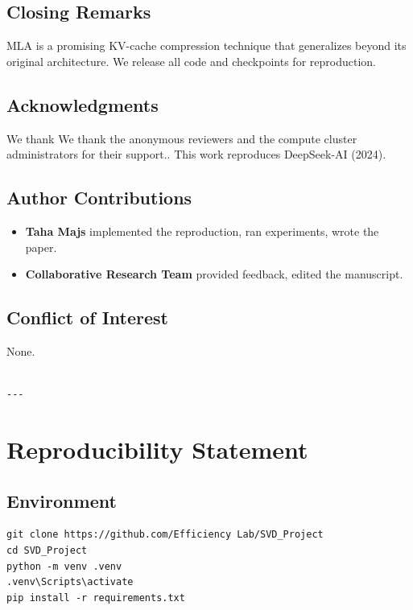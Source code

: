 \subsection{Closing Remarks}

MLA is a promising KV-cache compression technique that generalizes beyond 
its original architecture. We release all code and checkpoints for 
reproduction.

\subsection{Acknowledgments}

We thank We thank the anonymous reviewers and the compute cluster administrators for their support.. This work reproduces DeepSeek-AI (2024).

\subsection{Author Contributions}

\begin{itemize}
\item \textbf{Taha Majs} implemented the reproduction, ran experiments, wrote
  the paper.
\item \textbf{Collaborative Research Team} provided feedback, edited the manuscript.

\end{itemize}
\subsection{Conflict of Interest}

None.
\begin{lstlisting}

---
\end{lstlisting}


\section{Reproducibility Statement}

\subsection{Environment}

\begin{lstlisting}
git clone https://github.com/Efficiency Lab/SVD_Project
cd SVD_Project
python -m venv .venv
.venv\Scripts\activate
pip install -r requirements.txt
\end{lstlisting}

